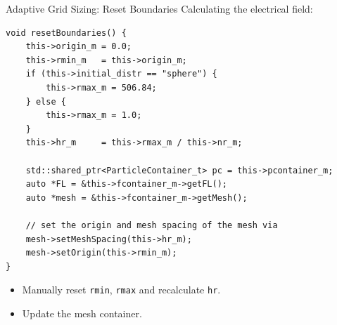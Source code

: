 \begin{frame}[fragile]{Adaptive Grid Sizing: Reset Boundaries}
    Calculating the electrical field:
\begin{lstlisting}
void resetBoundaries() {
    this->origin_m = 0.0;
    this->rmin_m   = this->origin_m;
    if (this->initial_distr == "sphere") {
        this->rmax_m = 506.84;
    } else {
        this->rmax_m = 1.0;
    }
    this->hr_m     = this->rmax_m / this->nr_m;

    std::shared_ptr<ParticleContainer_t> pc = this->pcontainer_m;
    auto *FL = &this->fcontainer_m->getFL();
    auto *mesh = &this->fcontainer_m->getMesh();
    
    // set the origin and mesh spacing of the mesh via
    mesh->setMeshSpacing(this->hr_m);
    mesh->setOrigin(this->rmin_m); 
}
\end{lstlisting}
    \begin{itemize}
        \item Manually reset \verb|rmin|, \verb|rmax| and recalculate \verb|hr|.
        \item Update the mesh container.
    \end{itemize}
\end{frame}


